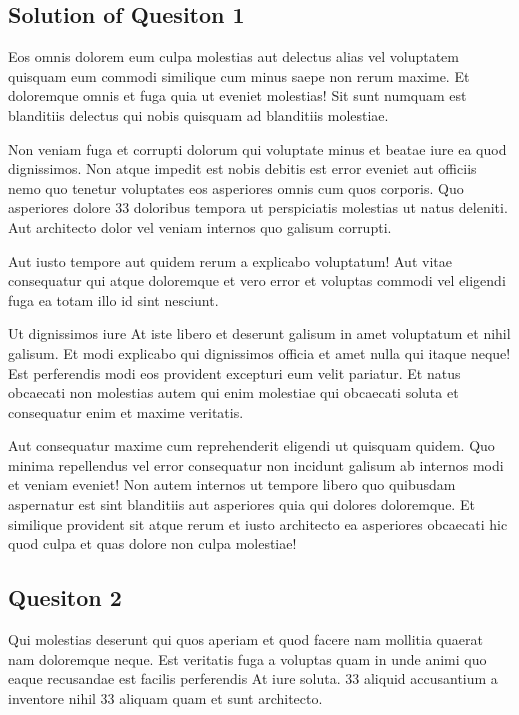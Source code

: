 \documentclass[11pt]{article}
\begin{document}
\subsection*{Solution of Quesiton 1}

Eos omnis dolorem eum culpa molestias aut delectus alias vel voluptatem quisquam eum commodi similique cum minus saepe non rerum maxime. Et doloremque omnis et fuga quia ut eveniet molestias! Sit sunt numquam est blanditiis delectus qui nobis quisquam ad blanditiis molestiae.

Non veniam fuga et corrupti dolorum qui voluptate minus et beatae iure ea quod dignissimos. Non atque impedit est nobis debitis est error eveniet aut officiis nemo quo tenetur voluptates eos asperiores omnis cum quos corporis. Quo asperiores dolore 33 doloribus tempora ut perspiciatis molestias ut natus deleniti. Aut architecto dolor vel veniam internos quo galisum corrupti.

Aut iusto tempore aut quidem rerum a explicabo voluptatum! Aut vitae consequatur qui atque doloremque et vero error et voluptas commodi vel eligendi fuga ea totam illo id sint nesciunt.

Ut dignissimos iure At iste libero et deserunt galisum in amet voluptatum et nihil galisum. Et modi explicabo qui dignissimos officia et amet nulla qui itaque neque! Est perferendis modi eos provident excepturi eum velit pariatur. Et natus obcaecati non molestias autem qui enim molestiae qui obcaecati soluta et consequatur enim et maxime veritatis.

Aut consequatur maxime cum reprehenderit eligendi ut quisquam quidem. Quo minima repellendus vel error consequatur non incidunt galisum ab internos modi et veniam eveniet! Non autem internos ut tempore libero quo quibusdam aspernatur est sint blanditiis aut asperiores quia qui dolores doloremque. Et similique provident sit atque rerum et iusto architecto ea asperiores obcaecati hic quod culpa et quas dolore non culpa molestiae!

\subsection*{Quesiton 2}

Qui molestias deserunt qui quos aperiam et quod facere nam mollitia quaerat nam doloremque neque. Est veritatis fuga a voluptas quam in unde animi quo eaque recusandae est facilis perferendis At iure soluta. 33 aliquid accusantium a inventore nihil 33 aliquam quam et sunt architecto.
\end{document}
